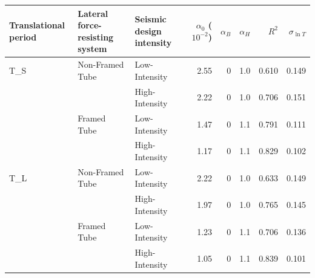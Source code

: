 \begin{tabular}{lllrrrrr}
\toprule
Translational period & Lateral force-resisting system & Seismic design intensity & $\alpha_0$ ($10^{-2}$) & $\alpha_B$ & $\alpha_H$ & $R^2$ & $\sigma_{\ln T}$ \\
\midrule
T_S & Non-Framed Tube & Low-Intensity & 2.55 & 0 & 1.0 & 0.610 & 0.149 \\
 &  & High-Intensity & 2.22 & 0 & 1.0 & 0.706 & 0.151 \\
 & Framed Tube & Low-Intensity & 1.47 & 0 & 1.1 & 0.791 & 0.111 \\
 &  & High-Intensity & 1.17 & 0 & 1.1 & 0.829 & 0.102 \\
T_L & Non-Framed Tube & Low-Intensity & 2.22 & 0 & 1.0 & 0.633 & 0.149 \\
 &  & High-Intensity & 1.97 & 0 & 1.0 & 0.765 & 0.145 \\
 & Framed Tube & Low-Intensity & 1.23 & 0 & 1.1 & 0.706 & 0.136 \\
 &  & High-Intensity & 1.05 & 0 & 1.1 & 0.839 & 0.101 \\
\bottomrule
\end{tabular}
